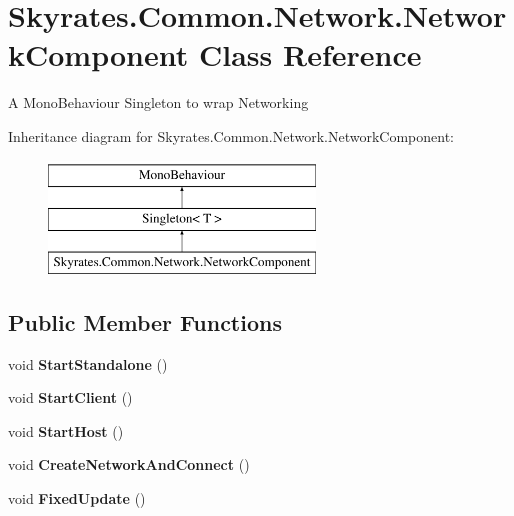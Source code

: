 \hypertarget{class_skyrates_1_1_common_1_1_network_1_1_network_component}{\section{Skyrates.\-Common.\-Network.\-Network\-Component Class Reference}
\label{class_skyrates_1_1_common_1_1_network_1_1_network_component}
}


A Mono\-Behaviour Singleton to wrap Networking  


Inheritance diagram for Skyrates.\-Common.\-Network.\-Network\-Component\-:\begin{figure}[H]
\begin{center}
\leavevmode
\includegraphics[height=3.000000cm]{class_skyrates_1_1_common_1_1_network_1_1_network_component}
\end{center}
\end{figure}
\subsection*{Public Member Functions}
\begin{DoxyCompactItemize}
\item 
\hypertarget{class_skyrates_1_1_common_1_1_network_1_1_network_component_a7c114635cacfe2c83daa34b24f19ddfe}{void {\bfseries Start\-Standalone} ()}\label{class_skyrates_1_1_common_1_1_network_1_1_network_component_a7c114635cacfe2c83daa34b24f19ddfe}

\item 
\hypertarget{class_skyrates_1_1_common_1_1_network_1_1_network_component_a603ef2f07c91d81df3e8fe1e3a83607e}{void {\bfseries Start\-Client} ()}\label{class_skyrates_1_1_common_1_1_network_1_1_network_component_a603ef2f07c91d81df3e8fe1e3a83607e}

\item 
\hypertarget{class_skyrates_1_1_common_1_1_network_1_1_network_component_adb9471cbf34ab4cfcbb9bddce713396d}{void {\bfseries Start\-Host} ()}\label{class_skyrates_1_1_common_1_1_network_1_1_network_component_adb9471cbf34ab4cfcbb9bddce713396d}

\item 
\hypertarget{class_skyrates_1_1_common_1_1_network_1_1_network_component_af961362129a46169d869f297e4a5f6a1}{void {\bfseries Create\-Network\-And\-Connect} ()}\label{class_skyrates_1_1_common_1_1_network_1_1_network_component_af961362129a46169d869f297e4a5f6a1}

\item 
\hypertarget{class_skyrates_1_1_common_1_1_network_1_1_network_component_af56feb55f10d80ea3817946d48cd49c1}{void {\bfseries Fixed\-Update} ()}\label{class_skyrates_1_1_common_1_1_network_1_1_network_component_af56feb55f10d80ea3817946d48cd49c1}

\end{DoxyCompactItemize}
